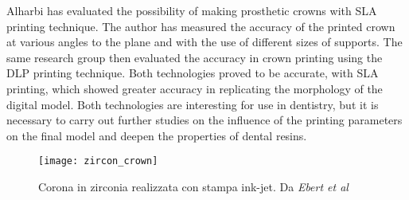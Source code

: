 Alharbi \parencite{Reference101} has evaluated the possibility of making prosthetic crowns with SLA printing technique. The author has measured the accuracy of the printed crown at various angles to the plane and with the use of different sizes of supports. The same research group then evaluated the accuracy in crown printing using the DLP \parencite{Reference102} printing technique. Both technologies proved to be accurate, with SLA printing, which showed greater accuracy in replicating the morphology of the digital model. Both technologies are interesting for use in dentistry, but it is necessary to carry out further studies on the influence of the printing parameters on the final model and deepen the properties of dental resins.
\begin{wrapfigure} {R} {0.4\textwidth}
\vspace{-20pt}
	\begin{center}
	\texttt{[image: zircon\_crown]}
    \caption{Corona in zirconia realizzata con stampa ink-jet. Da \emph{Ebert et al} \parencite{Reference106}}
    \label{fig:zircon_crown}
    \end{center}
\vspace{-20pt}
\end{wrapfigure}

